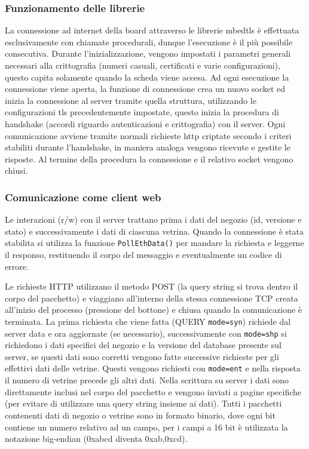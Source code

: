 \subsubsection{Funzionamento delle librerie}

La connessione ad internet della board attraverso le librerie mbedtls \`e effettuata esclusivamente con chiamate procedurali, dunque l'esecuzione \`e il pi\`u possibile consecutiva. Durante l'inizializzazione, vengono impostati i parametri generali necessari alla crittografia (numeri casuali, certificati e varie configurazioni), questo capita solamente quando la scheda viene accesa. Ad ogni esecuzione la connessione viene aperta, la funzione di connessione crea un nuovo socket ed inizia la connessione al server tramite quella struttura, utilizzando le configurazioni tls precedentemente impostate, questo inizia la procedura di handshake (accordi riguardo autenticazioni e crittografia) con il server. Ogni comunicazione avviene tramite normali richieste http criptate secondo i criteri stabiliti durante l'handshake, in maniera analoga vengono ricevute e gestite le risposte. Al termine della procedura la connessione e il relativo socket vengono chiusi.

\subsubsection{Comunicazione come client web}


Le interazioni (r/w) con il server trattano prima i dati del negozio (id, versione e stato) e successivamente i dati di ciascuna vetrina. Quando la connessione \`e stata stabilita si utilizza la funzione \texttt{PollEthData()} per mandare la richiesta e leggerne il responso, restituendo il corpo del messaggio e eventualmente un codice di errore. 

Le richieste HTTP utilizzano il metodo POST (la query string si trova dentro il corpo del pacchetto) e viaggiano all'interno della stessa connessione TCP creata all'inizio del processo (pressione del bottone) e chiusa quando la comunicazione \`e terminata. La prima richiesta che viene fatta (QUERY \texttt{mode=syn}) richiede dal server data e ora aggiornate (se necessario), successivamente con \texttt{mode=shp} si richiedono i dati specifici del negozio e la versione del database presente sul server, se questi dati sono corretti vengono fatte successive richieste per gli effettivi dati delle vetrine. Questi vengono richiesti con \texttt{mode=ent} e nella risposta il numero di vetrine precede gli altri dati. Nella scrittura su server i dati sono direttamente inclusi nel corpo del pacchetto e vengono inviati a pagine specifiche (per evitare di utilizzare una query string insieme ai dati). Tutti i pacchetti contenenti dati di negozio o vetrine sono in formato binario, dove ogni bit contiene un numero relativo ad un campo, per i campi a 16 bit \`e utilizzata la notazione big-endian (0xabcd diventa 0xab,0xcd). 

